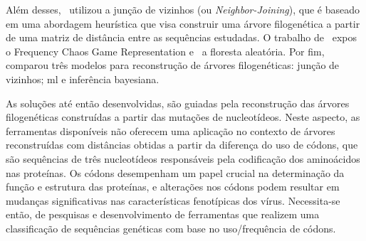 Além desses,~\cite{potdar_phylogenetic_2021} utilizou a junção de vizinhos (ou \textit{Neighbor-Joining}), que é baseado em uma abordagem heurística que visa construir uma árvore filogenética a partir de uma matriz de distância entre as sequências estudadas. O trabalho de~\cite{lichtblau_alignment-free_2019} expos o Frequency Chaos Game Representation e~\cite{kim_ngs_2022} a floresta aleatória. Por fim,~\cite{dimitrov_updated_2019} comparou três modelos para reconstrução de árvores filogenéticas: junção de vizinhos; \ac{ml} e inferência bayesiana.

As soluções até então desenvolvidas, são guiadas pela reconstrução das árvores filogenéticas construídas a partir das mutações de nucleotídeos. Neste aspecto, as ferramentas disponíveis não oferecem uma aplicação no contexto de árvores reconstruídas com distâncias obtidas a partir da diferença do uso de códons, que são sequências de três nucleotídeos responsáveis pela codificação dos aminoácidos nas proteínas. Os códons desempenham um papel crucial na determinação da função e estrutura das proteínas, e alterações nos códons podem resultar em mudanças significativas nas características fenotípicas dos vírus. Necessita-se então, de pesquisas e desenvolvimento de ferramentas que realizem uma classificação de sequências genéticas com base no uso/frequência de códons.




